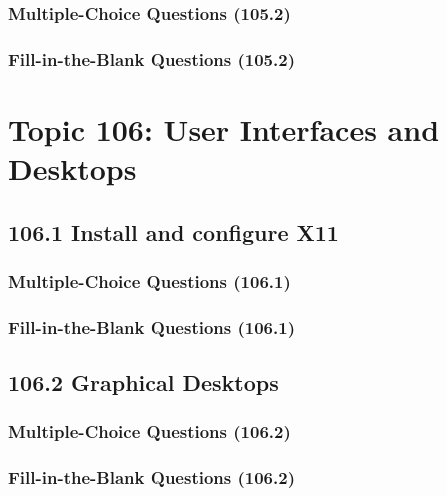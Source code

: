 \documentclass[a4paper]{report}
\begin{document}
\subsubsection*{Multiple-Choice Questions (105.2)}

\subsubsection*{Fill-in-the-Blank Questions (105.2)}


\section*{Topic 106: User Interfaces and Desktops}

\subsection*{106.1 Install and configure X11}
\subsubsection*{Multiple-Choice Questions (106.1)}

\subsubsection*{Fill-in-the-Blank Questions (106.1)}

\subsection*{106.2 Graphical Desktops}
\subsubsection*{Multiple-Choice Questions (106.2)}

\subsubsection*{Fill-in-the-Blank Questions (106.2)}
\end{document}
